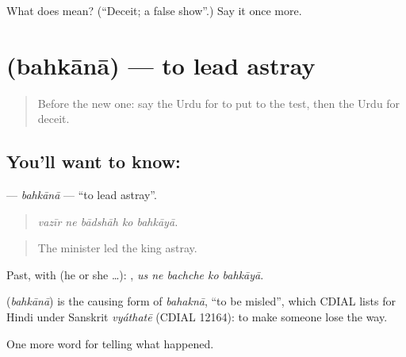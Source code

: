 \begin{tcolorbox}[breakable,colback=teal!4,colframe=teal!35!black,title={Before you move on}]
What does  mean? (\textquotedblleft{}Deceit; a false show\textquotedblright{}.) Say it once more.
\end{tcolorbox}
\section[\texorpdfstring{\ur{بہکانا} (bahkānā)}{بہکانا (bahkānā)}]{ (bahkānā) — to lead astray}

\label{lesson:UR-C328-bahkana}



\begin{quote}
Before the new one: say the Urdu for to put to the test, then the Urdu for deceit.
\end{quote}

\subsection*{You'll want to know: }
\textbf{} — \emph{bahkānā} — \textquotedblleft{}to lead astray\textquotedblright{}.

\begin{quote}
    
\end{quote}

\begin{quote}
\emph{vazīr ne bādshāh ko bahkāyā.}
\end{quote}

\begin{quote}
The minister led the king astray.
\end{quote}

Past, with  (he or she …):     , \emph{us ne bachche ko bahkāyā}.

\begin{cousinweb}
\textbf{} (\emph{bahkānā}) is the causing form of \emph{bahaknā}, \textquotedblleft{}to be misled\textquotedblright{}, which CDIAL lists for Hindi under Sanskrit \emph{vyáthatē} (CDIAL 12164): to make someone lose the way.
\end{cousinweb}

\begin{grammarlens}[title={What you've built}]
One more word for telling what happened.
\end{grammarlens}

